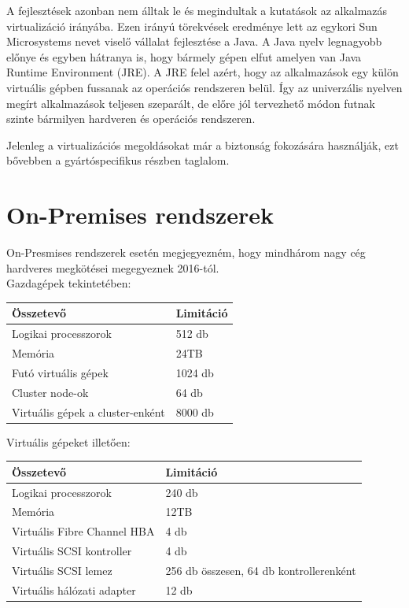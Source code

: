 \documentclass[12pt,oneside,justify,table]{book}
\begin{document}
A fejlesztések azonban nem álltak le és megindultak a kutatások az alkalmazás virtualizáció irányába. 
Ezen irányú törekvések eredménye lett az egykori Sun Microsystems nevet viselő vállalat fejlesztése a Java. 
A Java nyelv legnagyobb előnye és egyben hátranya is, hogy bármely gépen elfut amelyen van Java Runtime Environment (JRE). 
A JRE felel azért, hogy az alkalmazások egy külön virtuális gépben fussanak az operációs rendszeren belül. 
Így az univerzális nyelven megírt alkalmazások teljesen szeparált, de előre jól tervezhető módon futnak szinte bármilyen hardveren és operációs rendszeren.

Jelenleg a virtualizációs megoldásokat már a biztonság fokozására használják, ezt bővebben a gyártóspecifikus részben taglalom.

\section{On-Premises rendszerek}
\noindent On-Presmises rendszerek esetén megjegyezném, hogy mindhárom nagy cég hardveres megkötései megegyeznek 2016-tól. \cite{VMwareLimits} \cite{Hyper-VLimits}\\

\noindent Gazdagépek tekintetében: \\
\begin{table}[ht]
\centering
	\begin{tabular}{l | l}
		\textbf{Összetevő} & \textbf{Limitáció} \\
		\hline
		Logikai processzorok & 512 db \\
		Memória & 24TB \\
		Futó virtuális gépek & 1024 db \\
		Cluster node-ok & 64 db \\
		Virtuális gépek a cluster-enként & 8000 db\\
	\end{tabular}
\end{table}

\noindent Virtuális gépeket illetően:
\begin{table}[ht]
\centering
	\begin{tabular}{l | l}
		\textbf{Összetevő} & \textbf{Limitáció} \\
		\hline
		Logikai processzorok & 240 db \\
		Memória & 12TB \\
		Virtuális Fibre Channel HBA & 4 db \\
		Virtuális SCSI kontroller & 4 db \\
		Virtuális SCSI lemez & 256 db összesen, 64 db kontrollerenként \\
		Virtuális hálózati adapter & 12 db \\
	\end{tabular}
\end{table}
\end{document}
